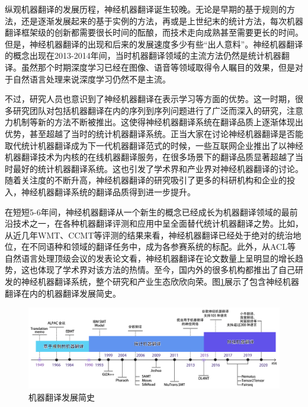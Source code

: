 \parinterval 纵观机器翻译的发展历程，神经机器翻译诞生较晚。无论是早期的基于规则的方法，还是逐渐发展起来的基于实例的方法，再或是上世纪末的统计方法，每次机器翻译框架级的创新都需要很长时间的酝酿，而技术走向成熟甚至需要更长的时间。但是，神经机器翻译的出现和后来的发展速度多少有些“出人意料”。神经机器翻译的概念出现在2013-2014年间，当时机器翻译领域的主流方法仍然是统计机器翻译。虽然那个时期深度学习已经在图像、语音等领域取得令人瞩目的效果，但是对于自然语言处理来说深度学习仍然不是主流。

\parinterval 不过，研究人员也意识到了神经机器翻译在表示学习等方面的优势。这一时期，很多研究团队对包括机器翻译在内的序列到序列问题进行了广泛而深入的研究，注意力机制等新的方法不断被推出。这使得神经机器翻译系统在翻译品质上逐渐体现出优势，甚至超越了当时的统计机器翻译系统。正当大家在讨论神经机器翻译是否能取代统计机器翻译成为下一代机器翻译范式的时候，一些互联网企业推出了以神经机器翻译技术为内核的在线机器翻译服务，在很多场景下的翻译品质显著超越了当时最好的统计机器翻译系统。这也引发了学术界和产业界对神经机器翻译的讨论。随着关注度的不断升高，神经机器翻译的研究吸引了更多的科研机构和企业的投入，神经机器翻译系统的翻译品质得到进一步提升。

\parinterval 在短短5-6年间，神经机器翻译从一个新生的概念已经成长为机器翻译领域的最前沿技术之一，在各种机器翻译评测和应用中呈全面替代统计机器翻译之势。比如，从近几年WMT、CCMT等评测的结果来看，神经机器翻译已经处于绝对的统治地位，在不同语种和领域的翻译任务中，成为各参赛系统的标配。此外，从ACL等自然语言处理顶级会议的发表论文看，神经机器翻译在论文数量上呈明显的增长趋势，这也体现了学术界对该方法的热情。至今，国内外的很多机构都推出了自己研发的神经机器翻译系统，整个研究和产业生态欣欣向荣。图\ref{fig:10-1}展示了包含神经机器翻译在内的机器翻译发展简史。

\begin{figure}[htp]
\centering
\includegraphics[scale=0.4]{./Chapter10/Figures/mt-history.png}
\caption{机器翻译发展简史}
\label{fig:10-1}
\end{figure}

